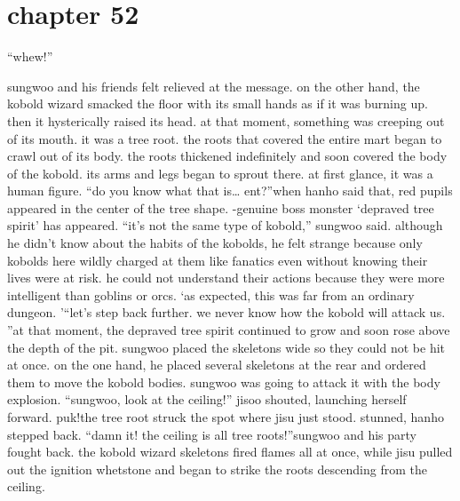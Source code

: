 \section{chapter 52}

                            “whew!”




sungwoo and his friends felt relieved at the message.
on the other hand, the kobold wizard smacked the floor with its small hands as if it was burning up.
 then it hysterically raised its head.
 at that moment, something was creeping out of its mouth.
it was a tree root.
 the roots that covered the entire mart began to crawl out of its body.
the roots thickened indefinitely and soon covered the body of the kobold.
 its arms and legs began to sprout there.
 at first glance, it was a human figure.
“do you know what that is… ent?”when hanho said that, red pupils appeared in the center of the tree shape.
-genuine boss monster ‘depraved tree spirit’ has appeared.
“it’s not the same type of kobold,” sungwoo said.
although he didn’t know about the habits of the kobolds, he felt strange because only kobolds here wildly charged at them like fanatics even without knowing their lives were at risk.
 he could not understand their actions because they were more intelligent than goblins or orcs.
‘as expected, this was far from an ordinary dungeon.
’“let’s step back further.
 we never know how the kobold will attack us.
”at that moment, the depraved tree spirit continued to grow and soon rose above the depth of the pit.
 sungwoo placed the skeletons wide so they could not be hit at once.
 on the one hand, he placed several skeletons at the rear and ordered them to move the kobold bodies.
sungwoo was going to attack it with the body explosion.
“sungwoo, look at the ceiling!” jisoo shouted, launching herself forward.
puk!the tree root struck the spot where jisu just stood.
 stunned, hanho stepped back.
“damn it! the ceiling is all tree roots!”sungwoo and his party fought back.
 the kobold wizard skeletons fired flames all at once, while jisu pulled out the ignition whetstone and began to strike the roots descending from the ceiling.

